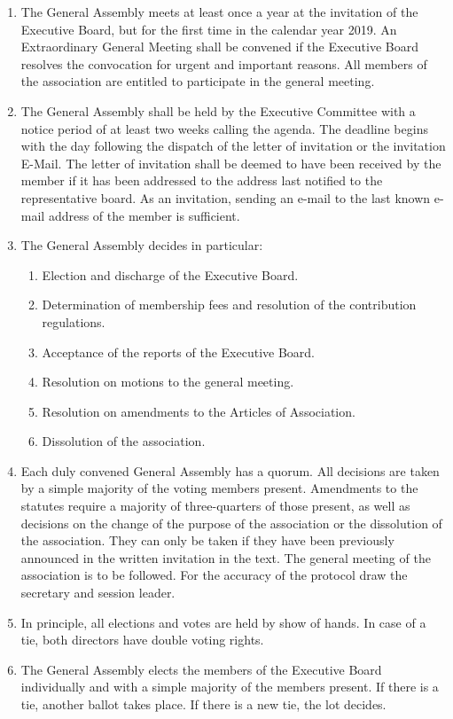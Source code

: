 \documentclass{article}
\begin{document}
\begin{enumerate}
	\item The General Assembly meets at least once a year at the invitation of the Executive Board, but for the first time in the calendar year 2019. 
	An Extraordinary General Meeting shall be convened if the Executive Board resolves the convocation for urgent and important reasons. 
	All members of the association are entitled to participate in the general meeting.
	\item The General Assembly shall be held by the Executive Committee with a notice period of at least two weeks calling the agenda. 
	The deadline begins with the day following the dispatch of the letter of invitation or the invitation E-Mail. 
	The letter of invitation shall be deemed to have been received by the member if it has been addressed to the address last notified to the representative board. 
	As an invitation, sending an e-mail to the last known e-mail address of the member is sufficient.
	\item The General Assembly decides in particular: \\
	
	\begin{enumerate}
		\item Election and discharge of the Executive Board.
		\item Determination of membership fees and resolution of the contribution regulations.
		\item Acceptance of the reports of the Executive Board.
		\item Resolution on motions to the general meeting.
		\item Resolution on amendments to the Articles of Association.
		\item Dissolution of the association.
	\end{enumerate}
	
	\item Each duly convened General Assembly has a quorum.
	 All decisions are taken by a simple majority of the voting members present. 
	 Amendments to the statutes require a majority of three-quarters of those present, as well as decisions on the change of the purpose of the association or the dissolution of the association. 
	 They can only be taken if they have been previously announced in the written invitation in the text. 
	 The general meeting of the association is to be followed. 
	 For the accuracy of the protocol draw the secretary and session leader.
	\item In principle, all elections and votes are held by show of hands. In case of a tie, both directors have double voting rights.
	\item The General Assembly elects the members of the Executive Board individually and with a simple majority of the members present. If there is a tie, another ballot takes place. 
	If there is a new tie, the lot decides.
\end{enumerate}
\end{document}
